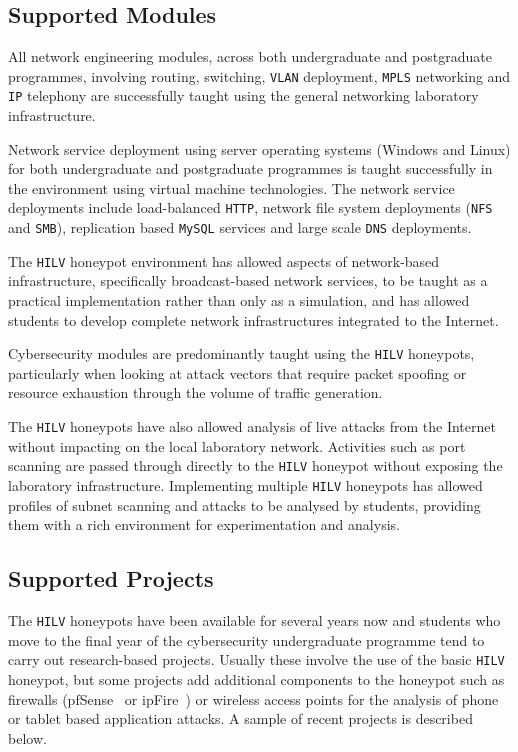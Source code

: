 \documentclass{ieeeaccess}
\begin{document}
\subsection{Supported Modules\label{Modules}}

All network engineering modules, across both undergraduate and postgraduate
programmes, involving routing, switching, \texttt{VLAN} deployment,
\texttt{MPLS} networking and \texttt{IP} telephony are successfully taught
using the general networking laboratory infrastructure.

Network service deployment using server operating systems (Windows and Linux)
for both undergraduate and postgraduate programmes is taught successfully in
the environment using virtual machine technologies. The network service
deployments include load-balanced \texttt{HTTP}, network file system
deployments (\texttt{NFS} and \texttt{SMB}), replication based \texttt{MySQL}
services and large scale \texttt{DNS} deployments.

The \texttt{HILV} honeypot environment has allowed aspects of network-based
infrastructure, specifically broadcast-based network services, to be taught as
a practical implementation rather than only as a simulation, and has allowed
students to develop complete network infrastructures integrated to the
Internet.

Cybersecurity modules are predominantly taught using the \texttt{HILV}
honeypots, particularly when looking at attack vectors that require packet
spoofing or resource exhaustion through the volume of traffic generation.

The \texttt{HILV} honeypots have also allowed analysis of live attacks from the
Internet without impacting on the local laboratory network. Activities such as
port scanning are passed through directly to the \texttt{HILV} honeypot without
exposing the laboratory infrastructure. Implementing multiple \texttt{HILV}
honeypots has allowed profiles of subnet scanning and attacks to be analysed by
students, providing them with a rich environment for experimentation and
analysis.

\subsection{Supported Projects\label{Projects}}
The \texttt{HILV} honeypots have been available for several years now and
students who move to the final year of the cybersecurity undergraduate
programme tend to carry out research-based projects. Usually these involve the
use of the basic \texttt{HILV} honeypot, but some projects add additional
components to the honeypot such as firewalls (pfSense~\cite{PFSENSE:18} or
ipFire~\cite{IPFIRE:18}) or wireless access points for the analysis of phone or
tablet based application attacks. A sample of recent projects is described below.
\end{document}
